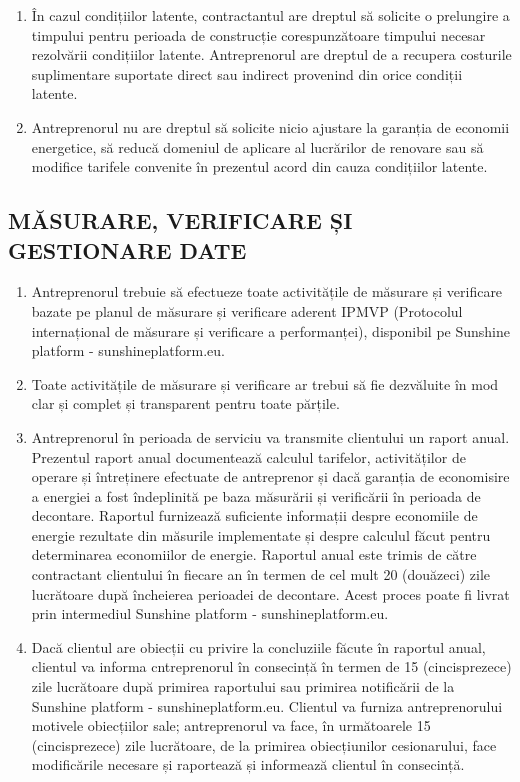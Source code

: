 \begin{multicols}{2}
\begin{enumerate}
\item În cazul condițiilor latente, contractantul are dreptul să solicite o prelungire a timpului pentru perioada de construcție corespunzătoare timpului necesar rezolvării condițiilor latente. Antreprenorul are dreptul de a recupera costurile suplimentare suportate direct sau indirect provenind din orice condiții latente.
\item Antreprenorul nu are dreptul să solicite nicio ajustare la garanția de economii energetice, să reducă domeniul de aplicare al lucrărilor de renovare sau să modifice tarifele convenite în prezentul acord din cauza condițiilor latente.
\end{enumerate}


\subsection{MĂSURARE, VERIFICARE ȘI GESTIONARE DATE}
\begin{enumerate}
\item Antreprenorul trebuie să efectueze toate activitățile de măsurare și verificare bazate pe planul de măsurare și verificare aderent IPMVP (Protocolul internațional de măsurare și verificare a performanței), disponibil pe Sunshine platform - sunshineplatform.eu.
\item Toate activitățile de măsurare și verificare ar trebui să fie dezvăluite în mod clar și complet și transparent pentru toate părțile.
\item Antreprenorul în perioada de serviciu va transmite clientului un raport anual. Prezentul raport anual documentează calculul tarifelor, activităților de operare și întreținere efectuate de antreprenor și dacă garanția de economisire a energiei a fost îndeplinită pe baza măsurării și verificării în perioada de decontare. Raportul furnizează suficiente informații despre economiile de energie rezultate din măsurile implementate și despre calculul făcut pentru determinarea economiilor de energie. Raportul anual este trimis de către contractant clientului în fiecare an în termen de cel mult 20 (douăzeci) zile lucrătoare după încheierea perioadei de decontare. Acest proces poate fi livrat prin intermediul Sunshine platform - sunshineplatform.eu.
\item Dacă clientul are obiecții cu privire la concluziile făcute în raportul anual, clientul va informa cntreprenorul în consecință în termen de 15 (cincisprezece) zile lucrătoare după primirea raportului sau primirea notificării de la Sunshine platform - sunshineplatform.eu. Clientul va furniza antreprenorului motivele obiecțiilor sale; antreprenorul va face, în următoarele 15 (cincisprezece) zile lucrătoare, de la primirea obiecțiunilor cesionarului, face modificările necesare și raportează și informează clientul în consecință.

\end{enumerate}
\end{multicols}
